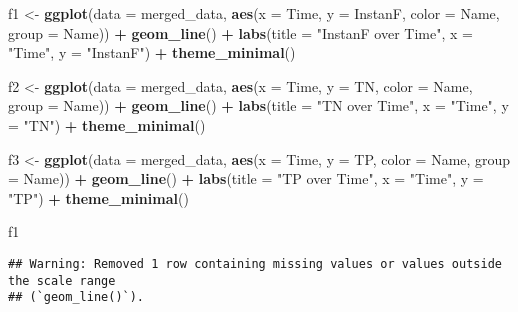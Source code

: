 \documentclass[
]{article}
\newenvironment{Shaded}{\begin{snugshade}}{\end{snugshade}}
\newcommand{\AttributeTok}[1]{\textcolor[rgb]{0.13,0.29,0.53}{#1}}
\newcommand{\FunctionTok}[1]{\textcolor[rgb]{0.13,0.29,0.53}{\textbf{#1}}}
\newcommand{\NormalTok}[1]{#1}
\newcommand{\OtherTok}[1]{\textcolor[rgb]{0.56,0.35,0.01}{#1}}
\newcommand{\SpecialCharTok}[1]{\textcolor[rgb]{0.81,0.36,0.00}{\textbf{#1}}}
\newcommand{\StringTok}[1]{\textcolor[rgb]{0.31,0.60,0.02}{#1}}
\begin{document}
\begin{Shaded}
\begin{Highlighting}[]
\NormalTok{f1 }\OtherTok{\textless{}{-}} \FunctionTok{ggplot}\NormalTok{(}\AttributeTok{data =}\NormalTok{ merged\_data, }\FunctionTok{aes}\NormalTok{(}\AttributeTok{x =}\NormalTok{ Time, }\AttributeTok{y =}\NormalTok{ InstanF, }\AttributeTok{color =}\NormalTok{ Name, }\AttributeTok{group =}\NormalTok{ Name)) }\SpecialCharTok{+}
  \FunctionTok{geom\_line}\NormalTok{() }\SpecialCharTok{+}
  \FunctionTok{labs}\NormalTok{(}\AttributeTok{title =} \StringTok{"InstanF over Time"}\NormalTok{, }\AttributeTok{x =} \StringTok{"Time"}\NormalTok{, }\AttributeTok{y =} \StringTok{"InstanF"}\NormalTok{) }\SpecialCharTok{+}
  \FunctionTok{theme\_minimal}\NormalTok{()}

\NormalTok{f2 }\OtherTok{\textless{}{-}} \FunctionTok{ggplot}\NormalTok{(}\AttributeTok{data =}\NormalTok{ merged\_data, }\FunctionTok{aes}\NormalTok{(}\AttributeTok{x =}\NormalTok{ Time, }\AttributeTok{y =}\NormalTok{ TN, }\AttributeTok{color =}\NormalTok{ Name, }\AttributeTok{group =}\NormalTok{ Name)) }\SpecialCharTok{+}
  \FunctionTok{geom\_line}\NormalTok{() }\SpecialCharTok{+}
  \FunctionTok{labs}\NormalTok{(}\AttributeTok{title =} \StringTok{"TN over Time"}\NormalTok{, }\AttributeTok{x =} \StringTok{"Time"}\NormalTok{, }\AttributeTok{y =} \StringTok{"TN"}\NormalTok{) }\SpecialCharTok{+}
  \FunctionTok{theme\_minimal}\NormalTok{()}

\NormalTok{f3 }\OtherTok{\textless{}{-}} \FunctionTok{ggplot}\NormalTok{(}\AttributeTok{data =}\NormalTok{ merged\_data, }\FunctionTok{aes}\NormalTok{(}\AttributeTok{x =}\NormalTok{ Time, }\AttributeTok{y =}\NormalTok{ TP, }\AttributeTok{color =}\NormalTok{ Name, }\AttributeTok{group =}\NormalTok{ Name)) }\SpecialCharTok{+}
  \FunctionTok{geom\_line}\NormalTok{() }\SpecialCharTok{+}
  \FunctionTok{labs}\NormalTok{(}\AttributeTok{title =} \StringTok{"TP over Time"}\NormalTok{, }\AttributeTok{x =} \StringTok{"Time"}\NormalTok{, }\AttributeTok{y =} \StringTok{"TP"}\NormalTok{) }\SpecialCharTok{+}
  \FunctionTok{theme\_minimal}\NormalTok{()}

\NormalTok{f1}
\end{Highlighting}
\end{Shaded}

\begin{verbatim}
## Warning: Removed 1 row containing missing values or values outside the scale range
## (`geom_line()`).
\end{verbatim}
\end{document}
